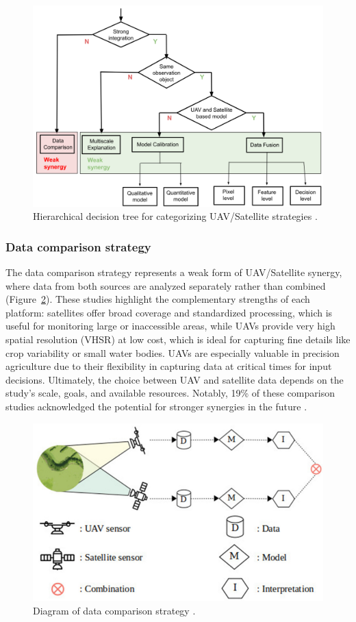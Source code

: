 \begin{figure}[H]
    \centering
    \includegraphics[width=0.8
    \textwidth]{chapters/chapter3/images/Figure11.png}
    \caption{Hierarchical decision tree for categorizing UAV/Satellite strategies \parencite{AlvarezVanhard2021}.}
    \label{fig:UAVSatelliteStrategies}
\end{figure}


\subsubsection{Data comparison strategy}
The data comparison strategy represents a weak form of UAV/Satellite synergy, where data from both sources are analyzed separately rather than combined (Figure~\ref{fig:DataComparison}). These studies highlight the complementary strengths of each platform: satellites offer broad coverage and standardized processing, which is useful for monitoring large or inaccessible areas, while UAVs provide very high spatial resolution (VHSR) at low cost, which is ideal for capturing fine details like crop variability or small water bodies. UAVs are especially valuable in precision agriculture due to their flexibility in capturing data at critical times for input decisions. Ultimately, the choice between UAV and satellite data depends on the study's scale, goals, and available resources. Notably, 19\% of these comparison studies acknowledged the potential for stronger synergies in the future \parencite{AlvarezVanhard2021}.

\begin{figure}[H]
    \centering
    \includegraphics[width=0.8
    \textwidth]{chapters/chapter3/images/Figure12.png}
    \caption{Diagram of data comparison strategy \parencite{AlvarezVanhard2021}.}
    \label{fig:DataComparison}
\end{figure}


